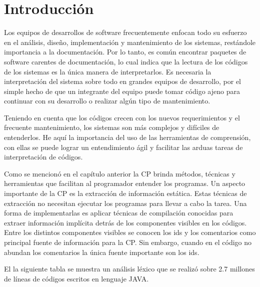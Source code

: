 \documentclass[a4paper,12pt]{report}
\begin{document}
\section{Introducción}

Los equipos de desarrollos de software frecuentemente enfocan todo su esfuerzo en el análisis, diseño, implementación y mantenimiento de los sistemas, restándole importancia a la documentación. Por lo tanto, es común encontrar paquetes de software carentes de documentación, lo cual indica que la lectura de los códigos de los sistemas es la única manera de interpretarlos. Es necesaria la interpretación del sistema sobre todo en grandes equipos de desarrollo, por el simple hecho de que un integrante del equipo puede tomar código ajeno para continuar con su desarrollo o realizar algún tipo de mantenimiento.

Teniendo en cuenta que los códigos crecen con los nuevos requerimientos y el frecuente mantenimiento, los sistemas son más complejos y difíciles de entenderlos. He aquí la importancia del uso de las herramientas de comprensión, con ellas se puede lograr un entendimiento ágil y facilitar las arduas tareas de interpretación de códigos.

Como se mencionó en el capítulo anterior la CP brinda métodos, técnicas y herramientas que facilitan al programador entender los programas. Un aspecto importante de la CP es la extracción de información estática. Estas técnicas de extracción no necesitan ejecutar los programas para llevar a cabo la tarea. Una forma de implementarlas es aplicar técnicas de compilación conocidas para extraer información implícita detrás de los componentes visibles en los códigos.
Entre los distintos componentes visibles se conocen los ids y los comentarios como principal fuente de información para la CP. Sin embargo, cuando en el código no abundan los comentarios la única fuente importante son los ids. 

El la siguiente tabla se muestra un análisis léxico que se realizó sobre 2.7 millones de líneas de códigos escritos en lenguaje JAVA.
\end{document}
